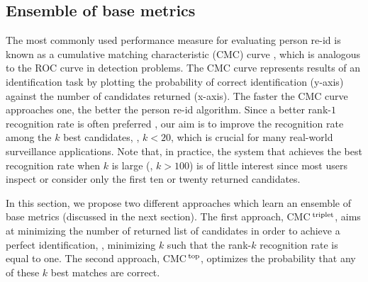 \documentclass[10pt,twocolumn,letterpaper]{article}
\def\CMCstruct{{\rm CMC$^{\,\rm top}$}\xspace}
\def\CMCtriplet{{\rm CMC$^{\,\rm triplet}$}\xspace}
\begin{document}
\subsection{Ensemble of base metrics}
\label{sec:ensemble}
%
%
%
The most commonly used performance measure for evaluating
person re-id is known as a cumulative
matching characteristic (CMC) curve \cite{Gray2007Evaluating},
which is analogous to the ROC curve in detection problems.
The CMC curve represents results of an identification task
by plotting the probability of correct identification (y-axis)
against the number of candidates returned (x-axis).
The faster the CMC curve approaches one, the better the person re-id algorithm.
Since a better rank-$1$ recognition rate is often preferred \cite{Zhao2014Learning},
our aim is to improve the recognition rate
among the $k$ best candidates, \eg, $k < 20$, which is crucial for many
real-world surveillance applications.
Note that, in practice, the system that achieves the best
recognition rate when $k$ is large (\eg, $k > 100$)
is of little interest since most users inspect or
consider only the first ten or twenty returned candidates.
%
%


In this section, we propose two different approaches
which learn an ensemble of base metrics (discussed in the next section).
%
The first approach, \CMCtriplet, aims at minimizing the number of returned list of candidates
in order to achieve a perfect identification,
\ie, minimizing $k$ such that the rank-$k$ recognition rate is equal to one.
The second approach, \CMCstruct, optimizes the probability that any of these
$k$ best matches are correct.

%
\end{document}
